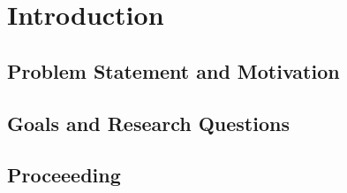 \chapter{Introduction}
\label{ch:introduction}

\section{Problem Statement and Motivation} 
\label{ch:intro-problemStatement}




\section{Goals and Research Questions}
\label{ch:intro-goals}





\section{Proceeeding}
\label{ch:intro-proceeeding}

